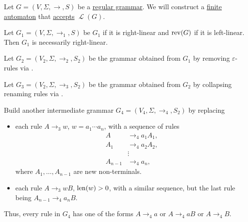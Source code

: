 \begin{algorithm}\label{alg:finite_automaton_from_regular_grammar}
  Let \( G = (V, \Sigma, \to, S) \) be a \hyperref[def:chomsky_hierarchy/regular]{regular grammar}. We will construct a \hyperref[def:finite_automaton]{finite automaton} that \hyperref[def:finite_automaton/language]{accepts} \( \mscrL(G) \).

  \begin{thmenum}
     Let \( G_1 = (V, \Sigma, \to_1, S) \) be \( G_1 \) if it is right-linear and \( \operatorname{rev}(G) \) if it is left-linear. Then \( G_1 \) is necessarily right-linear.

     Let \( G_2 = (V_2, \Sigma, \to_2, S_2) \) be the grammar obtained from \( G_1 \) by removing \( \varepsilon \)-rules via .

     Let \( G_3 = (V_2, \Sigma, \to_3, S_2) \) be the grammar obtained from \( G_2 \) by collapsing renaming rules via .

     Build another intermediate grammar \( G_4 = (V_4, \Sigma, \to_4, S_2) \) by replacing
    \begin{itemize}
      \item each rule \( A \to_3 w \), \( w = a_1 \cdots a_n \), with a sequence of rules
      \begin{align*}
        A       &\to_4 a_1 A_1, \\
        A_1     &\to_4 a_2 A_2, \\
                &\vdots \\
        A_{n-1} &\to_4 a_n,
      \end{align*}
      where \( A_1, \ldots, A_{n-1} \) are new non-terminals.

      \item each rule \( A \to_3 wB \), \( \operatorname{len}(w) > 0 \), with a similar sequence, but the last rule being \( A_{n-1} \to_4 a_n B \).
    \end{itemize}

    Thus, every rule in \( G_4 \) has one of the forms \( A \to_4 a \) or \( A \to_4 a B \) or \( A \to_4 B \).


\end{thmenum}
\end{algorithm}
